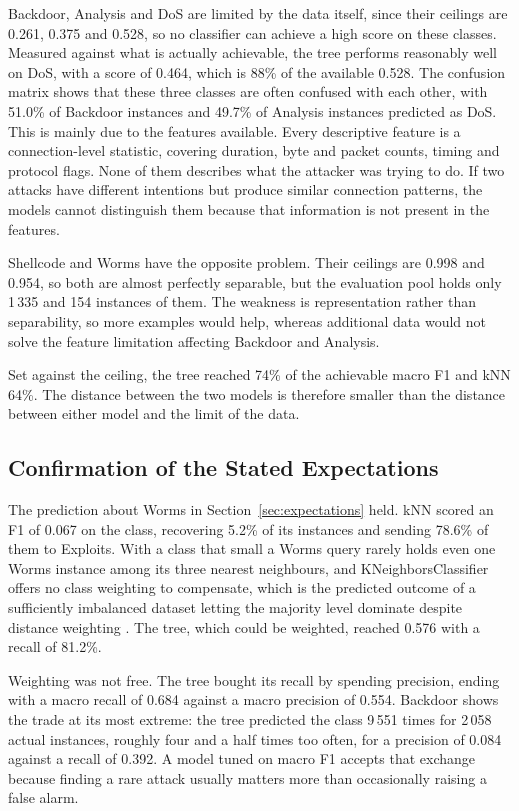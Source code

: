 \documentclass[conference]{IEEEtran}
\begin{document}
Backdoor, Analysis and DoS are limited by the data itself, since their ceilings are 
0.261, 0.375 and 0.528, so no classifier can achieve a high score on these classes. 
Measured against what is actually achievable, the tree performs reasonably well 
on DoS, with a score of 0.464, which is 88\% of the available 0.528. The 
confusion matrix shows that these three classes are often confused with each 
other, with 51.0\% of Backdoor instances and 49.7\% of Analysis instances
predicted as DoS.
This is mainly due to the features available. Every descriptive feature is a 
connection-level statistic, covering duration, byte and packet counts, timing 
and protocol flags. None of them describes what the attacker was trying to do. 
If two attacks have different intentions but produce similar connection patterns, 
the models cannot distinguish them because that information is not present in the 
features.

Shellcode and Worms have the opposite problem. Their ceilings are 0.998 and
0.954, so both are almost perfectly separable, but the evaluation pool holds
only 1\,335 and 154 instances of them. The weakness is representation rather
than separability, so more examples would help, whereas additional data would
not solve the feature limitation affecting Backdoor and Analysis.

Set against the ceiling, the tree reached 74\% of the achievable macro F1 and
kNN 64\%. The distance between the two models is therefore smaller than the
distance between either model and the limit of the data.

\subsection{Confirmation of the Stated Expectations}
\label{sec:expectconfirm}

The prediction about Worms in Section~\ref{sec:expectations} held. kNN scored
an F1 of 0.067 on the class, recovering 5.2\% of its instances and sending
78.6\% of them to Exploits. With a class that small a Worms query rarely holds
even one Worms instance among its three nearest neighbours, and
KNeighborsClassifier offers no class weighting to compensate, which is the
predicted outcome of a sufficiently imbalanced dataset letting the majority
level dominate despite distance weighting \cite{kelleher2015}. The tree, which
could be weighted, reached 0.576 with a recall of 81.2\%.

Weighting was not free. The tree bought its recall by spending precision, ending
with a macro recall of 0.684 against a macro precision of 0.554. Backdoor shows
the trade at its most extreme: the tree predicted the class 9\,551 times for
2\,058 actual instances, roughly four and a half times too often, for a
precision of 0.084 against a recall of 0.392. A model tuned on macro F1 accepts
that exchange because finding a rare attack usually matters more than
occasionally raising a false alarm.
\end{document}
